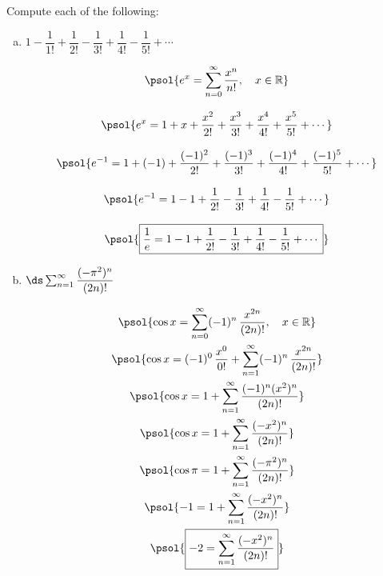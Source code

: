 \documentclass[12pt,letterpaper]{exam}
\begin{document}
\begin{questions}
\newpage
\question[16] Compute each of the following: \par\vspace{0.3cm}
	\begin{enumerate}[(a)]
	\item $1 - \dfrac{1}{1!} + \dfrac{1}{2!} - \dfrac{1}{3!} + \dfrac{1}{4!} - \dfrac{1}{5!} + \cdots$ \par\vspace{0.3cm}
		\[
		\begin{gathered}
		\psol{e^x= \sum_{n=0}^\infty \dfrac{x^n}{n!}, \quad x \in \mathbb{R}} \\[0.3cm]
		\psol{e^x= 1 + x + \dfrac{x^2}{2!} + \dfrac{x^3}{3!} + \dfrac{x^4}{4!} + \dfrac{x^5}{5!} + \cdots} \\[0.3cm]
		\psol{e^{-1}= 1 + (-1) + \dfrac{(-1)^2}{2!} + \dfrac{(-1)^3}{3!} + \dfrac{(-1)^4}{4!} + \dfrac{(-1)^5}{5!} + \cdots} \\[0.3cm]
		\psol{e^{-1}= 1 - 1 + \dfrac{1}{2!} - \dfrac{1}{3!} + \dfrac{1}{4!} - \dfrac{1}{5!} + \cdots} \\[0.3cm]
		\psol{\boxed{\dfrac{1}{e}= 1 - 1 + \dfrac{1}{2!} - \dfrac{1}{3!} + \dfrac{1}{4!} - \dfrac{1}{5!} + \cdots}}
		\end{gathered}
		\] \par\vspace{2.25cm}
	
	\item $\ds\sum_{n=1}^\infty \dfrac{(-\pi^2)^n}{(2n)!}$ \par\vspace{0.3cm}
		\[
		\begin{gathered}
		\psol{\cos x= \sum_{n=0}^\infty (-1)^n \, \dfrac{x^{2n}}{(2n)!}, \quad x \in \mathbb{R}} \\
		\psol{\cos x= (-1)^0 \, \dfrac{x^{0}}{0!} + \sum_{n=1}^\infty (-1)^n \, \dfrac{x^{2n}}{(2n)!}} \\
		\psol{\cos x= 1 + \sum_{n=1}^\infty \dfrac{(-1)^n (x^2)^n}{(2n)!}} \\ 
		\psol{\cos x= 1 + \sum_{n=1}^\infty \dfrac{(-x^2)^n}{(2n)!}} \\ 
		\psol{\cos \pi= 1 + \sum_{n=1}^\infty \dfrac{(-\pi^2)^n}{(2n)!}} \\ 
		\psol{-1= 1 + \sum_{n=1}^\infty \dfrac{(-x^2)^n}{(2n)!}} \\
		\psol{\boxed{-2= \sum_{n=1}^\infty \dfrac{(-x^2)^n}{(2n)!}}}
		\end{gathered}
		\]
	
	\newpage
	

\end{enumerate}
\end{questions}
\end{document}
